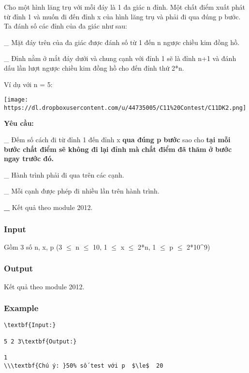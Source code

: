 



   Cho một hình lăng trụ với mỗi đáy là 1 đa giác n đỉnh. Một chất điểm xuất phát từ đỉnh 1 và muốn đi đến đỉnh x của hình lăng trụ và phải đi qua đúng p bước. Ta đánh số các đỉnh của đa giác như sau:  

   \_ Mặt đáy trên của đa giác được đánh số từ 1 đến n ngược chiều kim đồng hồ.  

   \_ Đỉnh nằm ở mắt đáy dưới và chung cạnh với đỉnh 1 sẽ là đỉnh n+1 và đánh dấu lần lượt ngược chiều kim đồng hồ cho đến đỉnh thứ 2*n.  

   Ví dụ với n = 5:  


\texttt{[image: https://dl.dropboxusercontent.com/u/44735005/C11\%20Contest/C11DK2.png]}

\textbf{    Yêu cầu:   }

   \_ Đếm số cách đi từ đỉnh 1 đến đỉnh x   \textbf{    qua đúng p bước   }   sao cho   \textbf{    tại mỗi bước chất điểm sẽ không đi lại đỉnh mà chất điểm đã thăm ở bước ngay trước đó.   }\textbf{}

   \_ Hành trình phải đi qua trên các cạnh.  

   \_ Mỗi cạnh được phép đi nhiều lần trên hành trình.  

\textbf{    \_   }   Kết quả theo module 2012.  

\subsubsection{   Input  }

   Gồm 3 số n, x, p (3  $\le$  n  $\le$  10, 1  $\le$  x  $\le$  2*n, 1  $\le$  p  $\le$  2*10^9)  

\subsubsection{   Output  }

   Kết quả theo module 2012.  

\subsubsection{   Example  }
\begin{verbatim}
\textbf{Input:}

5 2 3\textbf{Output:}

1
\\\textbf{Chú ý: }50% số test với p  $\le$  20
\end{verbatim}
